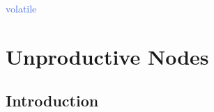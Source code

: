 \documentclass[xcolor={dvipsnames}]{beamer}
\begin{document}
{\begin{figure}
\begin{subfigure}{0.3\textwidth}
            \vspace{3mm}
        \end{subfigure}
    \end{figure}

    \tiny
    \textcolor{RoyalBlue}{volatile}
}
\section{Unproductive Nodes}
\subsection{Introduction}
\end{document}
